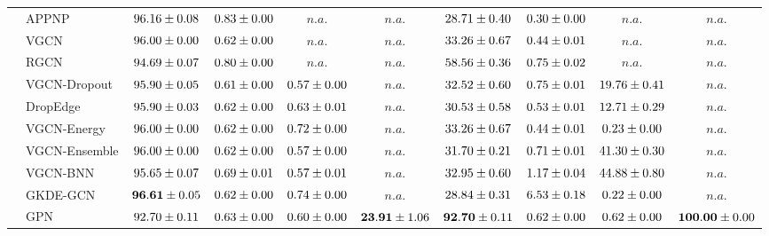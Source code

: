 \begin{table*}[!h]
{\begin{tabular}{ll|cccc|cccc}
        \midrule

        & APPNP & ${96.16\tiny \pm 0.08}$ & ${0.83\tiny \pm 0.00}$ & $n.a.$ & $n.a.$ & ${28.71\tiny \pm 0.40}$ & ${0.30\tiny \pm 0.00}$ & $n.a.$ & $n.a.$\\
        & VGCN & ${96.00\tiny \pm 0.00}$ & ${0.62\tiny \pm 0.00}$ & $n.a.$ & $n.a.$ & ${33.26\tiny \pm 0.67}$ & ${0.44\tiny \pm 0.01}$ & $n.a.$ & $n.a.$\\
        & RGCN & ${94.69\tiny \pm 0.07}$ & ${0.80\tiny \pm 0.00}$ & $n.a.$ & $n.a.$ & ${58.56\tiny \pm 0.36}$ & ${0.75\tiny \pm 0.02}$ & $n.a.$ & $n.a.$\\
        & VGCN-Dropout & ${95.90\tiny \pm 0.05}$ & ${0.61\tiny \pm 0.00}$ & ${0.57\tiny \pm 0.00}$ & $n.a.$ & ${32.52\tiny \pm 0.60}$ & ${0.75\tiny \pm 0.01}$ & ${19.76\tiny \pm 0.41}$ & $n.a.$\\
        & DropEdge & ${95.90\tiny \pm 0.03}$ & ${0.62\tiny \pm 0.00}$ & ${0.63\tiny \pm 0.01}$ & $n.a.$ & ${30.53\tiny \pm 0.58}$ & ${0.53\tiny \pm 0.01}$ & ${12.71\tiny \pm 0.29}$ & $n.a.$\\
        & VGCN-Energy & ${96.00\tiny \pm 0.00}$ & ${0.62\tiny \pm 0.00}$ & ${0.72\tiny \pm 0.00}$ & $n.a.$ & ${33.26\tiny \pm 0.67}$ & ${0.44\tiny \pm 0.01}$ & ${0.23\tiny \pm 0.00}$ & $n.a.$\\
        & VGCN-Ensemble & ${96.00\tiny \pm 0.00}$ & ${0.62\tiny \pm 0.00}$ & ${0.57\tiny \pm 0.00}$ & $n.a.$ & ${31.70\tiny \pm 0.21}$ & ${0.71\tiny \pm 0.01}$ & ${41.30\tiny \pm 0.30}$ & $n.a.$\\
        & VGCN-BNN & ${95.65\tiny \pm 0.07}$ & ${0.69\tiny \pm 0.01}$ & ${0.57\tiny \pm 0.01}$ & $n.a.$ & ${32.95\tiny \pm 0.60}$ & ${1.17\tiny \pm 0.04}$ & ${{44.88}\tiny \pm 0.80}$ & $n.a.$\\
        & GKDE-GCN & ${\mathbf{96.61}\tiny \pm 0.05}$ & ${0.62\tiny \pm 0.00}$ & ${0.74\tiny \pm 0.00}$ & $n.a.$ & ${28.84\tiny \pm 0.31}$ & ${{6.53}\tiny \pm 0.18}$ & ${0.22\tiny \pm 0.00}$ & $n.a.$\\
        & GPN & ${92.70\tiny \pm 0.11}$ & ${0.63\tiny \pm 0.00}$ & ${0.60\tiny \pm 0.00}$ & ${\mathbf{23.91}\tiny \pm 1.06}$ & ${\mathbf{92.70}\tiny \pm 0.11}$ & ${0.62\tiny \pm 0.00}$ & ${0.62\tiny \pm 0.00}$ & ${\mathbf{100.00}\tiny \pm 0.00}$\\


\end{tabular}}
\end{table*}

